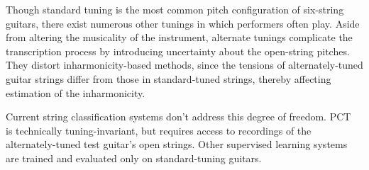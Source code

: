 \documentclass[12pt]{cmuthesis}
\begin{document}
Though standard tuning is the most common pitch configuration of six-string guitars, there exist numerous other tunings in which performers often play. Aside from altering the musicality of the instrument, alternate tunings complicate the transcription process by introducing uncertainty about the open-string pitches. They distort inharmonicity-based methods, since the tensions of alternately-tuned guitar strings differ from those in standard-tuned strings, thereby affecting estimation of the inharmonicity. 

Current string classification systems don't address this degree of freedom. PCT~\cite{barbanchoi2012} is technically tuning-invariant, but requires access to recordings of the alternately-tuned test guitar's open strings. Other supervised learning systems~\cite{kehling2014, dittmar2013, abesser2012} are trained and evaluated only on standard-tuning guitars.
\end{document}
